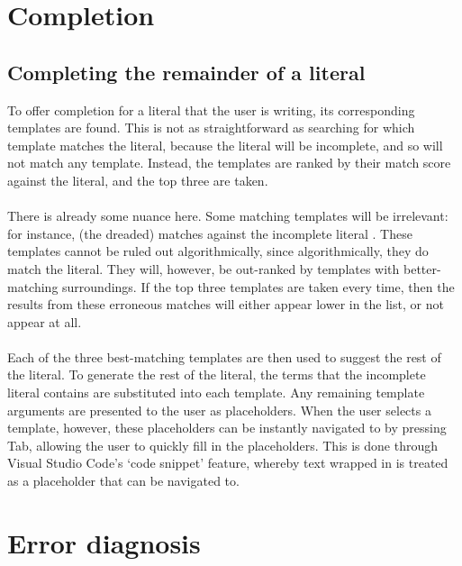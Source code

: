 \documentclass[../main.tex]{subfiles}
\begin{document}
\section{Completion}
\subsection{Completing the remainder of a literal}
To offer completion for a literal that the user is writing, its corresponding templates are found. This is not as straightforward as searching for which template matches the literal, because the literal will be incomplete, and so will not match any template. Instead, the templates are ranked by their match score against the literal, and the top three are taken.
\\
\\
There is already some nuance here. Some matching templates will be irrelevant: for instance, (the dreaded)  matches against the incomplete literal . These templates cannot be ruled out algorithmically, since algorithmically, they do match the literal. They will, however, be out-ranked by templates with better-matching surroundings. If the top three templates are taken every time, then the results from these erroneous matches will either appear lower in the list, or not appear at all.
\\ 
\\
Each of the three best-matching templates are then used to suggest the rest of the literal. To generate the rest of the literal, the terms that the incomplete literal contains are substituted into each template. Any remaining template arguments are presented to the user as placeholders. When the user selects a template, however, these placeholders can be instantly navigated to by pressing Tab, allowing the user to quickly fill in the placeholders. This is done through Visual Studio Code's `code snippet' feature, whereby text wrapped in \codeword{${  }} is treated as a placeholder that can be navigated to.
%
%
%
\section{Error diagnosis}
\end{document}

